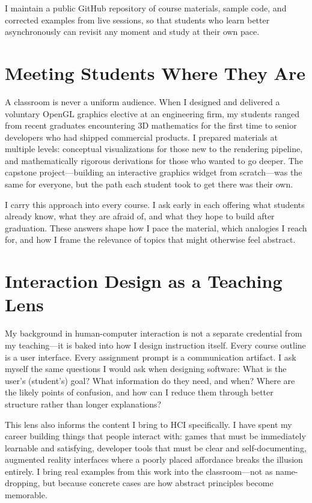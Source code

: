 \documentclass[11pt]{article}
\begin{document}
I maintain a public GitHub repository of course materials, sample code, and corrected examples from live sessions, so that students who learn better asynchronously can revisit any moment and study at their own pace.

\section*{Meeting Students Where They Are}

A classroom is never a uniform audience. When I designed and delivered a voluntary OpenGL graphics elective at an engineering firm, my students ranged from recent graduates encountering 3D mathematics for the first time to senior developers who had shipped commercial products. I prepared materials at multiple levels: conceptual visualizations for those new to the rendering pipeline, and mathematically rigorous derivations for those who wanted to go deeper. The capstone project---building an interactive graphics widget from scratch---was the same for everyone, but the path each student took to get there was their own.

I carry this approach into every course. I ask early in each offering what students already know, what they are afraid of, and what they hope to build after graduation. These answers shape how I pace the material, which analogies I reach for, and how I frame the relevance of topics that might otherwise feel abstract.

\section*{Interaction Design as a Teaching Lens}

My background in human-computer interaction is not a separate credential from my teaching---it is baked into how I design instruction itself. Every course outline is a user interface. Every assignment prompt is a communication artifact. I ask myself the same questions I would ask when designing software: What is the user's (student's) goal? What information do they need, and when? Where are the likely points of confusion, and how can I reduce them through better structure rather than longer explanations?

This lens also informs the content I bring to HCI specifically. I have spent my career building things that people interact with: games that must be immediately learnable and satisfying, developer tools that must be clear and self-documenting, augmented reality interfaces where a poorly placed affordance breaks the illusion entirely. I bring real examples from this work into the classroom---not as name-dropping, but because concrete cases are how abstract principles become memorable.
\end{document}

